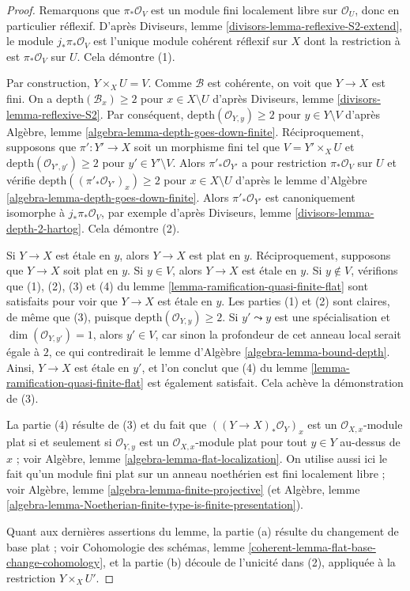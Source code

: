\begin{proof}
Remarquons que $\pi_*\mathcal{O}_V$ est un module fini localement libre
sur $\mathcal{O}_U$, donc en particulier réflexif.
D'après Diviseurs, lemme \ref{divisors-lemma-reflexive-S2-extend},
le module $j_*\pi_*\mathcal{O}_V$ est l'unique
module cohérent réflexif sur $X$ dont la restriction à
est $\pi_*\mathcal{O}_V$ sur $U$. Cela démontre (1).

\medskip\noindent
Par construction, $Y \times_X U = V$.
Comme $\mathcal{B}$ est cohérente, on voit que $Y \to X$ est fini.
On a $\text{depth}(\mathcal{B}_x) \geq 2$ pour $x \in X \setminus U$
d'après Diviseurs, lemme \ref{divisors-lemma-reflexive-S2}.
Par conséquent, $\text{depth}(\mathcal{O}_{Y, y}) \geq 2$ pour $y \in Y \setminus V$
d'après Algèbre, lemme \ref{algebra-lemma-depth-goes-down-finite}.
Réciproquement, supposons que $\pi' : Y' \to X$ soit un morphisme fini tel que
$V = Y' \times_X U$ et $\text{depth}(\mathcal{O}_{Y', y'}) \geq 2$
pour $y' \in Y' \setminus V$. Alors $\pi'_*\mathcal{O}_{Y'}$
a pour restriction $\pi_*\mathcal{O}_V$ sur $U$ et vérifie
$\text{depth}((\pi'_*\mathcal{O}_{Y'})_x) \geq 2$ pour
$x \in X \setminus U$ d'après le
lemme d'Algèbre \ref{algebra-lemma-depth-goes-down-finite}.
Alors $\pi'_*\mathcal{O}_{Y'}$ est canoniquement isomorphe
à $j_*\pi_*\mathcal{O}_V$, par exemple d'après
Diviseurs, lemme \ref{divisors-lemma-depth-2-hartog}.
Cela démontre (2).

\medskip\noindent
Si $Y \to X$ est étale en $y$, alors $Y \to X$ est plat en $y$.
Réciproquement, supposons que $Y \to X$ soit plat en $y$.
Si $y \in V$, alors $Y \to X$ est étale en $y$.
Si $y \not \in V$, vérifions que (1), (2), (3) et (4) du
lemme \ref{lemma-ramification-quasi-finite-flat} sont satisfaits
pour voir que $Y \to X$ est étale en $y$. Les parties (1) et (2)
sont claires, de même que (3), puisque $\text{depth}(\mathcal{O}_{Y, y}) \geq 2$.
Si $y' \leadsto y$ est une spécialisation et $\dim(\mathcal{O}_{Y, y'}) = 1$,
alors $y' \in V$, car sinon la profondeur de cet anneau local
serait égale à $2$, ce qui contredirait le
lemme d'Algèbre \ref{algebra-lemma-bound-depth}.
Ainsi, $Y \to X$ est étale en $y'$, et l'on conclut que (4) du
lemme \ref{lemma-ramification-quasi-finite-flat} est également satisfait.
Cela achève la démonstration de (3).

\medskip\noindent
La partie (4) résulte de (3) et du fait que $((Y \to X)_*\mathcal{O}_Y)_x$
est un $\mathcal{O}_{X, x}$-module plat si et seulement si $\mathcal{O}_{Y, y}$
est un $\mathcal{O}_{X, x}$-module plat pour tout $y \in Y$ au-dessus de $x$ ; voir
Algèbre, lemme \ref{algebra-lemma-flat-localization}. On utilise aussi ici
le fait qu'un module fini plat sur un anneau noethérien est fini localement
libre ; voir Algèbre, lemme \ref{algebra-lemma-finite-projective}
(et
Algèbre, lemme
\ref{algebra-lemma-Noetherian-finite-type-is-finite-presentation}).

\medskip\noindent
Quant aux dernières assertions du lemme, la partie (a) résulte du
changement de base plat ; voir
Cohomologie des schémas, lemme \ref{coherent-lemma-flat-base-change-cohomology},
et la partie (b) découle de l'unicité dans (2), appliquée à la restriction
$Y \times_X U'$.
\end{proof}


